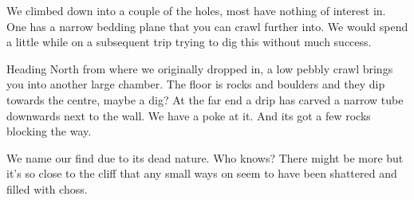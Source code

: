 We climbed down into a couple of the holes, most have nothing of interest in. One has a narrow bedding plane that you can crawl further into. We would spend a little while on a subsequent trip trying to dig this without much success. 
 
Heading North from where we originally dropped in, a low pebbly crawl brings you into another large chamber. The floor is rocks and boulders and they dip towards the centre, maybe a dig? At the far end a drip has carved a narrow tube downwards next to the wall. We have a poke at it. And its got a few rocks blocking the way.
 
We name our find  due to its dead nature. Who knows? There might be more but it’s so close to the cliff that any small ways on seem to have been shattered and filled with choss.


